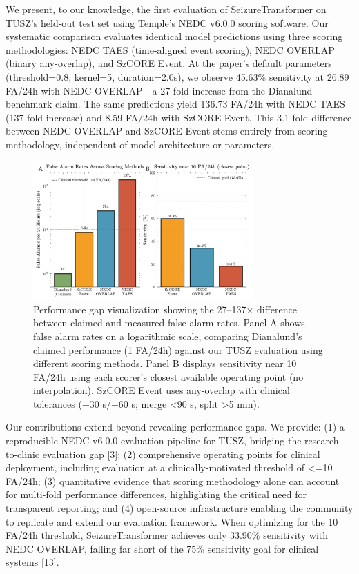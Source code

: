\documentclass[
]{article}
\begin{document}
We present, to our knowledge, the first evaluation of SeizureTransformer
on TUSZ's held-out test set using Temple's NEDC v6.0.0 scoring software.
Our systematic comparison evaluates identical model predictions using
three scoring methodologies: NEDC TAES (time-aligned event scoring),
NEDC OVERLAP (binary any-overlap), and SzCORE Event. At the paper's
default parameters (threshold=0.8, kernel=5, duration=2.0s), we observe
45.63\% sensitivity at 26.89 FA/24h with NEDC OVERLAP---a 27-fold
increase from the Dianalund benchmark claim. The same predictions yield
136.73 FA/24h with NEDC TAES (137-fold increase) and 8.59 FA/24h with
SzCORE Event. This 3.1-fold difference between NEDC OVERLAP and SzCORE
Event stems entirely from scoring methodology, independent of model
architecture or parameters.

\begin{figure}
\hypertarget{fig:performance-gap}{%
\centering
\includegraphics[width=0.75\textwidth,height=\textheight]{figures/output/arxiv/FIGURE_1_performance_gap.pdf}
\caption{Performance gap visualization showing the 27--137× difference
between claimed and measured false alarm rates. Panel A shows false
alarm rates on a logarithmic scale, comparing Dianalund's claimed
performance (1 FA/24h) against our TUSZ evaluation using different
scoring methods. Panel B displays sensitivity near 10 FA/24h using each
scorer's closest available operating point (no interpolation). SzCORE
Event uses any-overlap with clinical tolerances (−30 s/+60 s; merge
\textless90 s, split \textgreater5 min).}\label{fig:performance-gap}
}
\end{figure}

Our contributions extend beyond revealing performance gaps. We provide:
(1) a reproducible NEDC v6.0.0 evaluation pipeline for TUSZ, bridging
the research-to-clinic evaluation gap {[}3{]}; (2) comprehensive
operating points for clinical deployment, including evaluation at a
clinically-motivated threshold of \textless=10 FA/24h; (3) quantitative
evidence that scoring methodology alone can account for multi-fold
performance differences, highlighting the critical need for transparent
reporting; and (4) open-source infrastructure enabling the community to
replicate and extend our evaluation framework. When optimizing for the
10 FA/24h threshold, SeizureTransformer achieves only 33.90\%
sensitivity with NEDC OVERLAP, falling far short of the 75\% sensitivity
goal for clinical systems {[}13{]}.
\end{document}
